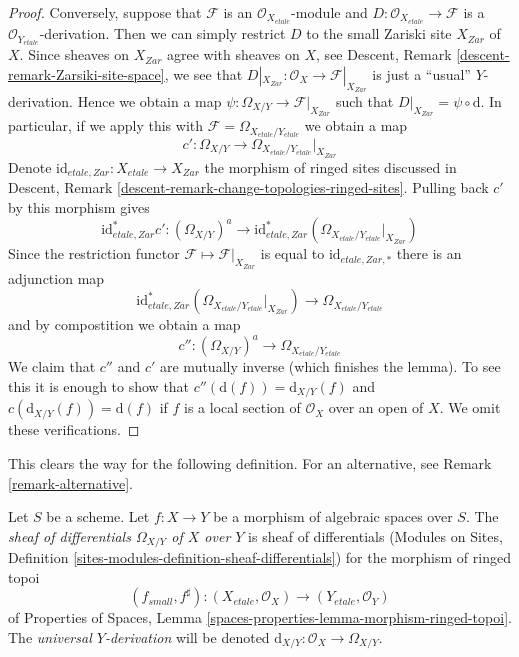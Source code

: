 \begin{proof}
\medskip\noindent
Conversely, suppose that $\mathcal{F}$ is an $\mathcal{O}_{X_{etale}}$-module
and $D : \mathcal{O}_{X_{etale}} \to \mathcal{F}$ is a
$\mathcal{O}_{Y_{etale}}$-derivation. Then we can simply restrict
$D$ to the small Zariski site $X_{Zar}$ of $X$. Since sheaves on $X_{Zar}$
agree with sheaves on $X$, see
Descent, Remark \ref{descent-remark-Zarsiki-site-space},
we see that $D|_{X_{Zar}} : \mathcal{O}_X \to \mathcal{F}|_{X_{Zar}}$
is just a ``usual'' $Y$-derivation. Hence we obtain a map
$\psi : \Omega_{X/Y} \longrightarrow \mathcal{F}|_{X_{Zar}}$
such that $D|_{X_{Zar}} = \psi \circ \text{d}$. In particular, if we
apply this with $\mathcal{F} = \Omega_{X_{etale}/Y_{etale}}$ we obtain
a map
$$
c' : \Omega_{X/Y} \longrightarrow \Omega_{X_{etale}/Y_{etale}}|_{X_{Zar}}
$$
Denote $\text{id}_{etale, Zar} : X_{etale} \to X_{Zar}$ the morphism
of ringed sites discussed in
Descent, Remark \ref{descent-remark-change-topologies-ringed-sites}.
Pulling back $c'$ by this morphism gives
$$
\text{id}_{etale, Zar}^*c' :
(\Omega_{X/Y})^a
\longrightarrow
\text{id}_{etale, Zar}^*\left(\Omega_{X_{etale}/Y_{etale}}|_{X_{Zar}}\right)
$$
Since the restriction functor $\mathcal{F} \mapsto \mathcal{F}|_{X_{Zar}}$
is equal to $\text{id}_{etale, Zar, *}$ there is an adjunction map
$$
\text{id}_{etale, Zar}^*\left(\Omega_{X_{etale}/Y_{etale}}|_{X_{Zar}}\right)
\longrightarrow
\Omega_{X_{etale}/Y_{etale}}
$$
and by compostition we obtain a map
$$
c'' :
(\Omega_{X/Y})^a
\longrightarrow
\Omega_{X_{etale}/Y_{etale}}
$$
We claim that $c''$ and $c'$ are mutually inverse (which finishes the lemma).
To see this it is enough to show that $c''(\text{d}(f)) = \text{d}_{X/Y}(f)$
and $c(\text{d}_{X/Y}(f)) = \text{d}(f)$ if $f$ is a local section of
$\mathcal{O}_X$ over an open of $X$. We omit these verifications.
\end{proof}

\noindent
This clears the way for the following definition. For an alternative, see
Remark \ref{remark-alternative}.

\begin{definition}
\label{definition-sheaf-differentials}
Let $S$ be a scheme. Let $f : X \to Y$ be a morphism of algebraic spaces
over $S$. The {\it sheaf of differentials $\Omega_{X/Y}$ of $X$ over $Y$}
is sheaf of differentials
(Modules on Sites,
Definition \ref{sites-modules-definition-sheaf-differentials})
for the morphism of ringed topoi
$$
(f_{small}, f^\sharp) :
(X_{etale}, \mathcal{O}_X)
\to
(Y_{etale}, \mathcal{O}_Y)
$$
of
Properties of Spaces,
Lemma \ref{spaces-properties-lemma-morphism-ringed-topoi}.
The {\it universal $Y$-derivation} will be denoted
$\text{d}_{X/Y} : \mathcal{O}_X \to \Omega_{X/Y}$.
\end{definition}

